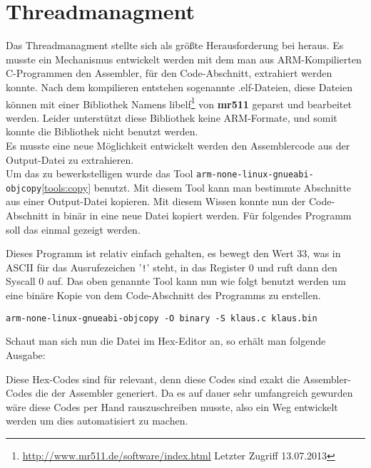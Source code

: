 \section{Threadmanagment}
Das Threadmanagment stellte sich als gr\"o\ss te Herausforderung bei \mops heraus. Es musste ein Mechanismus entwickelt werden mit dem man aus ARM-Kompilierten C-Programmen den Assembler, f\"ur den Code-Abschnitt, extrahiert werden konnte. Nach dem kompilieren entstehen sogenannte .elf-Dateien, diese Dateien k\"onnen mit einer Bibliothek Namens libelf\footnote{\url{http://www.mr511.de/software/index.html} Letzter Zugriff 13.07.2013} von \textbf{mr511} geparst und bearbeitet werden. Leider unterst\"utzt diese Bibliothek keine ARM-Formate, und somit konnte die Bibliothek nicht benutzt werden.\\
Es musste eine neue M\"oglichkeit entwickelt werden den Assemblercode aus der Output-Datei zu extrahieren.\\
Um das zu bewerkstelligen wurde das Tool \texttt{arm-none-linux-gnueabi-objcopy}\ref{tools:copy} benutzt. Mit diesem Tool kann man bestimmte Abschnitte aus einer Output-Datei kopieren. Mit diesem Wissen konnte nun der Code-Abschnitt in bin\"ar in eine neue Datei kopiert werden. F\"ur folgendes Programm soll das einmal gezeigt werden.

Dieses Programm ist relativ einfach gehalten, es bewegt den Wert 33, was in ASCII f\"ur das Ausrufezeichen '\texttt{!}' steht, in das Register 0 und ruft dann den Syscall 0 auf.
Das oben genannte Tool kann nun wie folgt benutzt werden um eine bin\"are Kopie von dem Code-Abschnitt des Programms zu erstellen.
\begin{lstlisting}
arm-none-linux-gnueabi-objcopy -O binary -S klaus.c klaus.bin
\end{lstlisting}
Schaut man sich nun die Datei im Hex-Editor an, so erh\"alt man folgende Ausgabe:

Diese Hex-Codes sind f\"ur \mops relevant, denn diese Codes sind exakt die Assembler-Codes die der Assembler generiert. Da es auf dauer sehr umfangreich gewurden w\"are diese Codes per Hand rauszuschreiben musste, also ein Weg entwickelt werden um dies automatisiert zu machen.
